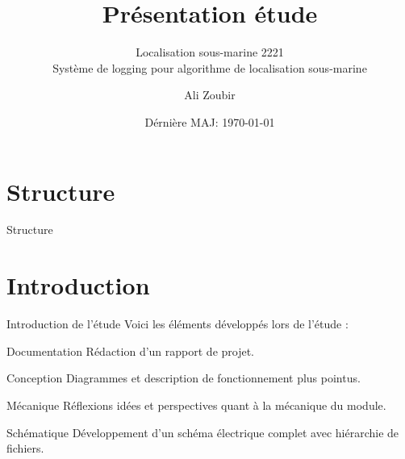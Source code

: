 \documentclass[compress,aspectratio=169]{beamer}
\title{Présentation étude}
\subtitle{Localisation sous-marine 2221 \\ {\small Système de logging pour algorithme de localisation sous-marine}}
\date{Dérnière MAJ: \today}
\author{Ali Zoubir}
\institute{ETML-ES\\ {\Medium Génie électrique}}
\begin{document}

\maketitle


\section*{Structure}
\begin{frame}{Structure}
	\tableofcontents[hideallsubsections]
\end{frame}

\section{Introduction}

\begin{frame}{Introduction de l'étude}
	Voici les éléments développés lors de l'étude :\vspace{-4pt}
	
	\begin{block}{Documentation}
		Rédaction d'un rapport de projet.
	\end{block}\vspace{-2mm}

	\begin{block}{Conception}
		Diagrammes et description de fonctionnement plus pointus.
	\end{block}\vspace{-2mm}
	
	\begin{block}{Mécanique}
		Réflexions idées et perspectives quant à la mécanique du module.
	\end{block}\vspace{-2mm}

	\begin{block}{Schématique}
		Développement d'un schéma électrique complet avec hiérarchie de fichiers.
	\end{block}\vspace{-2mm}
	
\end{frame}
\end{document}
